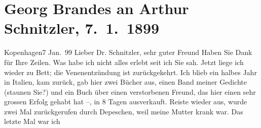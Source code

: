 

         
         \renewcommand{\erwaehntePersonen}{Personen: Richard Beer-Hofmann, Emilie Brandes, Joris-Karl Huysmans}
         \renewcommand{\erwaehnteOrte}{Orte: Deutschland, Dänemark, Frankreich, Italien, Kopenhagen, Lviv, Polen, Preußen, Südschleswig, Wien}
         \renewcommand{\erwaehnteWerke}{Werke: Das Vermächtnis. Schauspiel in drei Akten, Ein Dilemma, Julius Lange, Polen, Ungdomsvers [Jugendgedichte]}
               \section[Georg Brandes an Arthur Schnitzler, 7. 1. 1899]{ Georg Brandes an Arthur Schnitzler, 7. 1. 1899}\nopagebreak{}\rehead{ }\begin{ledgroupsized}[t]{13cm}\normalsize\beginnumbering \toendnotes[C]{\smallbreak\pagebreak[2]} 
\toendnotes[C]{\smallbreak}\pstart
           \raggedleft{}{\pb}Kopenhagen7 Jan. 99\pend
           \pstart{}Lieber Dr. Schnitzler, sehr guter Freund\pend\pstart
           Haben Sie Dank für Ihre Zeilen. Was habe ich nicht alles erlebt seit ich Sie sah.
                    Jetzt liege ich wieder zu Bett; die Venenentzündung ist zurückgekehrt.\pend
           \pstart
           Ich blieb ein halbes Jahr in Italien, kam
                    zurück, gab hier zwei Bücher aus, einen Band meiner Gedichte (staunen Sie?) und ein Buch über einen verstorbenen Freund, das
                    hier einen sehr grossen Erfolg gehabt hat –, in 8 Tagen ausverkauft. Reiste
                    wieder aus, wurde zwei Mal zurückgerufen durch Depeschen, {\pb}weil meine Mutter krank war. Das letzte Mal war ich

\end{ledgroupsized}
